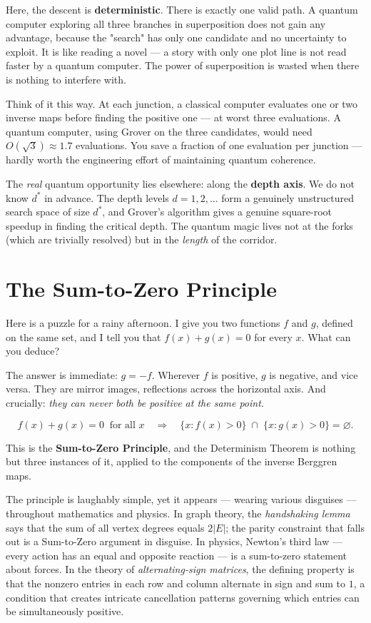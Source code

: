 \documentclass[11pt,twoside,openright]{book}
\theoremstyle{definition}
\theoremstyle{remark}
\begin{document}
Here, the descent is \textbf{deterministic}. There is exactly one valid path. A quantum computer exploring all three branches in superposition does not gain any advantage, because the "search" has only one candidate and no uncertainty to exploit. It is like reading a novel --- a story with only one plot line is not read faster by a quantum computer. The power of superposition is wasted when there is nothing to interfere with.

Think of it this way. At each junction, a classical computer evaluates one or two inverse maps before finding the positive one --- at worst three evaluations. A quantum computer, using Grover on the three candidates, would need $O(\sqrt{3}) \approx 1.7$ evaluations. You save a fraction of one evaluation per junction --- hardly worth the engineering effort of maintaining quantum coherence.

The \textit{real} quantum opportunity lies elsewhere: along the \textbf{depth axis}. We do not know $d^*$ in advance. The depth levels $d = 1, 2, \ldots$ form a genuinely unstructured search space of size $d^*$, and Grover's algorithm gives a genuine square-root speedup in finding the critical depth. The quantum magic lives not at the forks (which are trivially resolved) but in the \textit{length} of the corridor.



\section{The Sum-to-Zero Principle}

Here is a puzzle for a rainy afternoon. I give you two functions $f$ and $g$, defined on the same set, and I tell you that $f(x) + g(x) = 0$ for every $x$. What can you deduce?

The answer is immediate: $g = -f$. Wherever $f$ is positive, $g$ is negative, and vice versa. They are mirror images, reflections across the horizontal axis. And crucially: \textit{they can never both be positive at the same point.}

\[f(x) + g(x) = 0 \;\;\text{for all } x \quad\Longrightarrow\quad \{x : f(x) > 0\} \;\cap\; \{x : g(x) > 0\} = \varnothing.\]

This is the \textbf{Sum-to-Zero Principle}, and the Determinism Theorem is nothing but three instances of it, applied to the components of the inverse Berggren maps.

The principle is laughably simple, yet it appears --- wearing various disguises --- throughout mathematics and physics. In graph theory, the \textit{handshaking lemma} says that the sum of all vertex degrees equals $2|E|$; the parity constraint that falls out is a Sum-to-Zero argument in disguise. In physics, Newton's third law --- every action has an equal and opposite reaction --- is a sum-to-zero statement about forces. In the theory of \textit{alternating-sign matrices}, the defining property is that the nonzero entries in each row and column alternate in sign and sum to $1$, a condition that creates intricate cancellation patterns governing which entries can be simultaneously positive.
\end{document}
